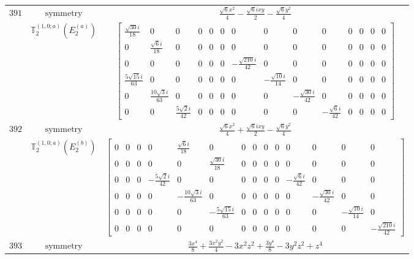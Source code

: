 \documentclass[fleqn,8pt,landscape]{jsarticle}
\begin{document}
\begin{longtable}{ccc}
$ 391 $ & $ \text{symmetry} $ & $ \frac{\sqrt{6} x^{2}}{4} - \frac{\sqrt{6} i x y}{2} - \frac{\sqrt{6} y^{2}}{4} $ \\
$  $ & $ \mathbb{T}_{2}^{(1,0;a)}(E_{2}^{(a)}) $ & $ \begin{bmatrix} \frac{\sqrt{30} i}{18} & 0 & 0 & 0 & 0 & 0 & 0 & 0 & 0 & 0 & 0 & 0 & 0 & 0 \\ 0 & \frac{\sqrt{6} i}{18} & 0 & 0 & 0 & 0 & 0 & 0 & 0 & 0 & 0 & 0 & 0 & 0 \\ 0 & 0 & 0 & 0 & 0 & 0 & - \frac{\sqrt{210} i}{42} & 0 & 0 & 0 & 0 & 0 & 0 & 0 \\ \frac{5 \sqrt{15} i}{63} & 0 & 0 & 0 & 0 & 0 & 0 & - \frac{\sqrt{10} i}{14} & 0 & 0 & 0 & 0 & 0 & 0 \\ 0 & \frac{10 \sqrt{3} i}{63} & 0 & 0 & 0 & 0 & 0 & 0 & - \frac{\sqrt{30} i}{42} & 0 & 0 & 0 & 0 & 0 \\ 0 & 0 & \frac{5 \sqrt{2} i}{42} & 0 & 0 & 0 & 0 & 0 & 0 & - \frac{\sqrt{6} i}{42} & 0 & 0 & 0 & 0 \end{bmatrix} $ \\ \hline
$ 392 $ & $ \text{symmetry} $ & $ \frac{\sqrt{6} x^{2}}{4} + \frac{\sqrt{6} i x y}{2} - \frac{\sqrt{6} y^{2}}{4} $ \\
$  $ & $ \mathbb{T}_{2}^{(1,0;a)}(E_{2}^{(b)}) $ & $ \begin{bmatrix} 0 & 0 & 0 & 0 & \frac{\sqrt{6} i}{18} & 0 & 0 & 0 & 0 & 0 & 0 & 0 & 0 & 0 \\ 0 & 0 & 0 & 0 & 0 & \frac{\sqrt{30} i}{18} & 0 & 0 & 0 & 0 & 0 & 0 & 0 & 0 \\ 0 & 0 & 0 & - \frac{5 \sqrt{2} i}{42} & 0 & 0 & 0 & 0 & 0 & 0 & - \frac{\sqrt{6} i}{42} & 0 & 0 & 0 \\ 0 & 0 & 0 & 0 & - \frac{10 \sqrt{3} i}{63} & 0 & 0 & 0 & 0 & 0 & 0 & - \frac{\sqrt{30} i}{42} & 0 & 0 \\ 0 & 0 & 0 & 0 & 0 & - \frac{5 \sqrt{15} i}{63} & 0 & 0 & 0 & 0 & 0 & 0 & - \frac{\sqrt{10} i}{14} & 0 \\ 0 & 0 & 0 & 0 & 0 & 0 & 0 & 0 & 0 & 0 & 0 & 0 & 0 & - \frac{\sqrt{210} i}{42} \end{bmatrix} $ \\ \hline
$ 393 $ & $ \text{symmetry} $ & $ \frac{3 x^{4}}{8} + \frac{3 x^{2} y^{2}}{4} - 3 x^{2} z^{2} + \frac{3 y^{4}}{8} - 3 y^{2} z^{2} + z^{4} $ \\

\end{longtable}
\end{document}
